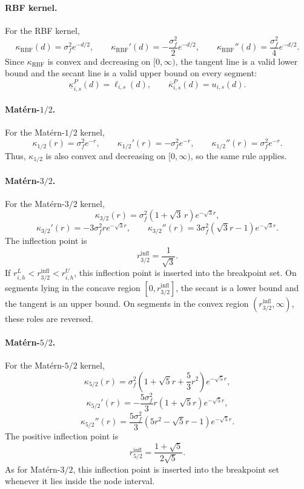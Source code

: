 \documentclass[pdflatex,sn-mathphys-num]{sn-jnl}%
\theoremstyle{thmstyleone}%
\theoremstyle{thmstyletwo}%
\theoremstyle{thmstylethree}%
\begin{document}
\paragraph{RBF kernel.}
For the RBF kernel,
\[
\kappa_{\mathrm{RBF}}(d)=\sigma_f^2 e^{-d/2},
\qquad
\kappa_{\mathrm{RBF}}'(d)=-\frac{\sigma_f^2}{2}e^{-d/2},
\qquad
\kappa_{\mathrm{RBF}}''(d)=\frac{\sigma_f^2}{4}e^{-d/2}.
\]
Since $\kappa_{\mathrm{RBF}}$ is convex and decreasing on $[0,\infty)$, the tangent line is a valid lower bound and the secant line is a valid upper bound on every segment:
\[
\underline{\kappa}^{P}_{i,s}(d)=\ell_{i,s}(d),
\qquad
\overline{\kappa}^{P}_{i,s}(d)=u_{i,s}(d).
\]

\paragraph{Mat\'ern-$1/2$.}
For the Mat\'ern-$1/2$ kernel,
\[
\kappa_{1/2}(r)=\sigma_f^2 e^{-r},
\qquad
\kappa_{1/2}'(r)=-\sigma_f^2 e^{-r},
\qquad
\kappa_{1/2}''(r)=\sigma_f^2 e^{-r}.
\]
Thus, $\kappa_{1/2}$ is also convex and decreasing on $[0,\infty)$, so the same rule applies.

\paragraph{Mat\'ern-$3/2$.}
For the Mat\'ern-$3/2$ kernel,
\[
\kappa_{3/2}(r)=\sigma_f^2(1+\sqrt{3}\,r)e^{-\sqrt{3}r},
\]
\[
\kappa_{3/2}'(r)=-3\sigma_f^2 r e^{-\sqrt{3}r},
\qquad
\kappa_{3/2}''(r)=3\sigma_f^2(\sqrt{3}r-1)e^{-\sqrt{3}r}.
\]
The inflection point is
\[
r_{3/2}^{\mathrm{infl}}=\frac{1}{\sqrt{3}}.
\]
If $r_{i,h}^L<r_{3/2}^{\mathrm{infl}}<r_{i,h}^U$, this inflection point is inserted into the breakpoint set. On segments lying in the concave region $[0,r_{3/2}^{\mathrm{infl}}]$, the secant is a lower bound and the tangent is an upper bound. On segments in the convex region $(r_{3/2}^{\mathrm{infl}},\infty)$, these roles are reversed.

\paragraph{Mat\'ern-$5/2$.}
For the Mat\'ern-$5/2$ kernel,
\[
\kappa_{5/2}(r)
=
\sigma_f^2\left(1+\sqrt{5}r+\frac{5}{3}r^2\right)e^{-\sqrt{5}r},
\]
\[
\kappa_{5/2}'(r)
=
-\frac{5\sigma_f^2}{3}r(1+\sqrt{5}r)e^{-\sqrt{5}r},
\]
\[
\kappa_{5/2}''(r)
=
\frac{5\sigma_f^2}{3}\left(5r^2-\sqrt{5}r-1\right)e^{-\sqrt{5}r}.
\]
The positive inflection point is
\[
r_{5/2}^{\mathrm{infl}}
=
\frac{1+\sqrt{5}}{2\sqrt{5}}.
\]
As for Mat\'ern-$3/2$, this inflection point is inserted into the breakpoint set whenever it lies inside the node interval.
\end{document}
